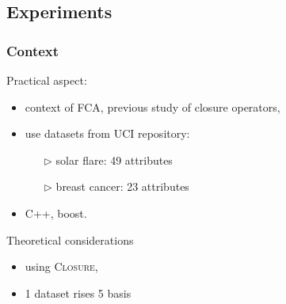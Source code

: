 
\subsection{Experiments}

\begin{frame}
\frametitle{Context}

Practical aspect:
\begin{itemize}
	\item context of FCA, previous study of closure operators,	
	\item use datasets from UCI repository:
		\begin{itemize}
			\item[\color{belize} $\triangleright$] solar flare: 49 attributes
			\item[\color{belize} $\triangleright$] breast cancer: 23 attributes
			
		\end{itemize}
	\item C++, boost.
	
\end{itemize}

\vspace{1.2em}

Theoretical considerations
\begin{itemize}
	\item using \textsc{Closure},
	\item 1 dataset rises 5 basis
\end{itemize}

\end{frame}

